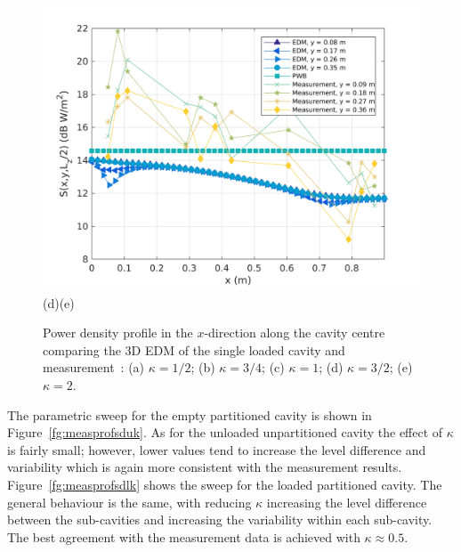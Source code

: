 \documentclass[a4paper]{article}
\numberwithin{equation}{section}
\newcounter{Figure}
\begin{document}
\begin{figure}[hp]
\begin{center}
\includegraphics[width=0.49\linewidth]{figures/SDM_3D_SL_PowerDensityProfileXMeas_JX_k2_0}\\
{\footnotesize (d)\hspace{75mm}(e)}\\
\vspace{-2mm}
\caption{\label{fg:measprofsslk} Power density profile in the $x$-direction along the cavity centre comparing
the 3D EDM of the single loaded cavity and measurement~\citep{Flintoft2017b}: (a) $\kappa=1/2$; (b) $\kappa=3/4$;
(c) $\kappa=1$; (d) $\kappa=3/2$; (e) $\kappa=2$.}
\end{center}
\end{figure}

The parametric sweep for the empty partitioned cavity is shown in Figure~\ref{fg:measprofsduk}. As for 
the unloaded unpartitioned cavity the effect of $\kappa$ is fairly small; however, lower values tend to
increase the level difference and variability which is again more consistent with the measurement 
results. Figure~\ref{fg:measprofsdlk} shows the sweep for the loaded partitioned cavity. The general
behaviour is the same, with reducing $\kappa$ increasing the level difference between the sub-cavities
and increasing the variability within each sub-cavity. The best agreement with the measurement
data is achieved with $\kappa\approx 0.5$.
\end{document}
